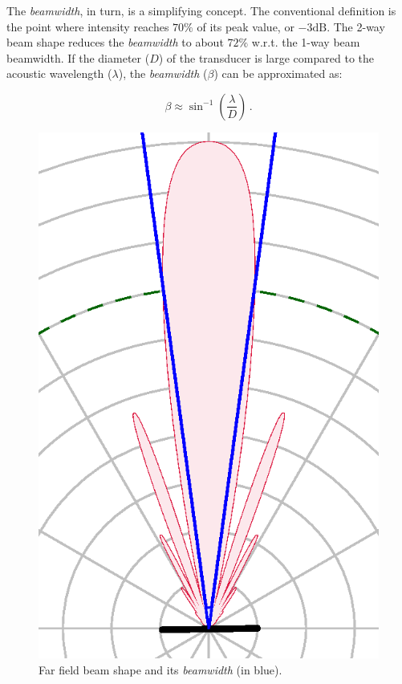The \textit{beamwidth}, in turn, is a simplifying concept. The conventional
definition is the point where intensity reaches $70\%$ of its peak value,
or $-3\text{dB}$. The 2-way beam shape reduces the \textit{beamwidth} to about
$72\%$ w.r.t. the 1-way beam beamwidth. If the
diameter ($D$) of the transducer is large compared to the acoustic wavelength ($\lambda$), the
\textit{beamwidth} ($\beta$) can be approximated as:

\[ \beta \approx \sin^{-1}\left(\frac{\lambda}{D} \right)\,. \]

\begin{figure}[h]
	\centering
	\includegraphics[scale=0.6,trim={0.46 0.072 0.46
	1.03},clip]{Chap2/fig/directivity.eps}
	\caption{Far field beam shape and its \textit{beamwidth} (in blue).}
	\label{fig:beamwidth}
\end{figure}

